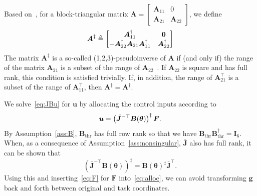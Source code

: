 \documentclass[../main.tex]{subfiles}
\begin{document}
Based on~\cite{Meyer1970}, for a block-triangular matrix $\bm{A} = \left[ \begin{smallmatrix} \bm{A}_{11} & 0 \\ \bm{A}_{21} & \bm{A}_{22} \end{smallmatrix}\right]$, we define
\begin{equation}\vspace{-2pt}
    \bm{A}^\ddagger \triangleq \begin{bmatrix} \bm{A}_{11}^\dagger & \bm{0} \\ -\bm{A}_{22}^\dagger \bm{A}_{21} \bm{A}_{11}^\dagger & \bm{A}_{22}^\dagger \end{bmatrix}
\end{equation}
The matrix $\bm{A}^\ddagger$ is a so-called (1,2,3)-pseudoinverse of $\bm{A}$ if (and only if) the range of the matrix $\bm{A}_{21}$ is a subset of the range of $\bm{A}_{22}$~\citep{Meyer1970}. If $\bm{A}_{22}$ is square and has full rank, this condition is satisfied trivially. %
If, in addition, the range of $\bm{A}_{21}^\top$ is a subset of the range of $\bm{A}_{11}^\top$, then $\bm{A}^\ddagger = \bm{A}^\dagger$.

We solve~\eqref{eq:JBu} for $\bm{u}$ by allocating the control inputs according to
\begin{equation}\label{eq:alloc}
    \bm{u} = \left( \bar{\bm{J}}^{-\top} \bm{B}(\bm{\theta}) \right)^{\ddag} \bm{F} .\vspace{5pt}
\end{equation}
By Assumption~\ref{ass:B}, $\bm{B}_{\textrm{thr}}$ has full row rank so that we have $\bm{B}_{\textrm{thr}}\bm{B}_{\textrm{thr}}^\dag = \bm{I}_6$. When, as a consequence of Assumption~\ref{ass:nonsingular}, $\bar{\bm{J}}$ also has full rank, it can be shown that
\begin{equation}
        \left( \bar{\bm{J}}^{-\top} \bm{B}(\bm{\theta}) \right)^{\ddag} = \bm{B}(\bm{\theta})^{\ddag} \bar{\bm{J}}^\top .
\end{equation}
Using this and inserting~\eqref{eq:F} for $\bm{F}$ into~\eqref{eq:alloc}, we can avoid transforming $\bm{g}$ back and forth between original and task coordinates.




\end{document}
